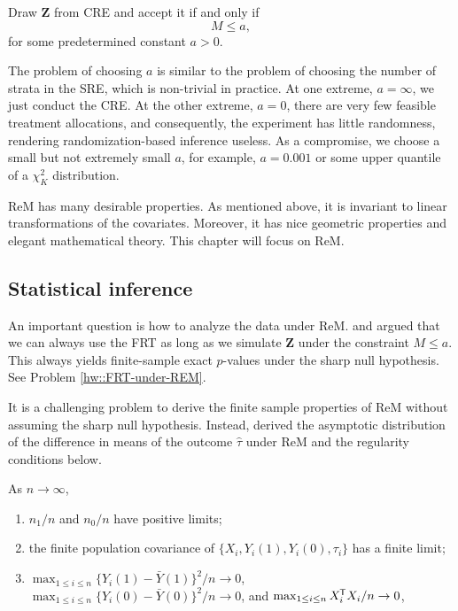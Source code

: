 \begin{definition}
[ReM]
Draw $\bm{Z}$ from CRE and accept it if and only if 
$$
M \leq a,
$$  
for some predetermined constant $a > 0$. 
\end{definition}



The problem of choosing $a$ is similar to the problem of choosing the number of strata in the SRE, which is non-trivial in practice. At one extreme, $a = \infty$, we just conduct the CRE. At the other extreme, $a=0$, there are very few feasible treatment allocations, and consequently, the experiment has little randomness, rendering randomization-based inference useless. As a compromise, we choose a small but not extremely small $a$, for example, $a=0.001$ or some upper quantile of a $\chi^2_K$ distribution. 


 

ReM has many desirable properties. As mentioned above, it is invariant to linear transformations of the covariates. Moreover, it has nice geometric properties and elegant mathematical theory. This chapter will focus on ReM.  


\subsection{Statistical inference}

An important question is how to analyze the data under ReM. \citet{bruhn2009pursuit} and \citet{morgan2012rerandomization} argued that we can always use the FRT as long as we simulate $\bm{Z}$ under the constraint $M\leq a$. This always yields finite-sample exact $p$-values under the sharp null hypothesis. See Problem \ref{hw::FRT-under-REM}. 


It is a challenging problem to derive the finite sample properties of ReM without assuming the sharp null hypothesis. Instead, \citet{li2018asymptotic} derived the asymptotic distribution of the difference in means of the outcome $\hat{\tau}$ under ReM and the regularity conditions below.



\begin{condition}\label{condition::regularity-cre-rem}
As $n\rightarrow \infty$,
\begin{enumerate}
\item 
$n_1/n$ and $n_0/n$ have positive limits;
\item 
the finite population covariance of $\{  X_i, Y_i(1), Y_i(0), \tau_i \}$ has a finite limit;
\item
$\max_{1\leq i \leq n}  \{   Y_i(1) - \bar{Y}(1) \} ^2/n \rightarrow 0 $,
$\max_{1\leq i \leq n}  \{   Y_i(0) - \bar{Y}(0) \}^2/n \rightarrow 0 $,
and $\max_{1\leq i \leq n}   X_i ^{\mkern-1.5mu\mathsf{T}} X_i/n \rightarrow 0 $,
\end{enumerate}
\end{condition} 


